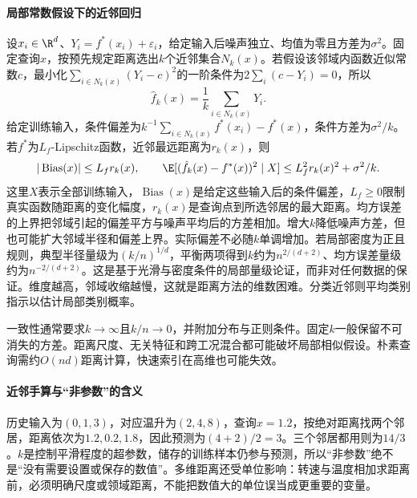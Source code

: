 \paragraph{局部常数假设下的近邻回归}
设$x_i\in\R^d$、$Y_i=f^*(x_i)+\varepsilon_i$，给定输入后噪声独立、均值为零且方差为$\sigma^2$。固定查询$x$，按预先规定距离选出$k$个近邻集合$N_k(x)$。若假设该邻域内函数近似常数$c$，最小化$\sum_{i\in N_k(x)}(Y_i-c)^2$的一阶条件为$2\sum_i(c-Y_i)=0$，所以
\begin{equation}
 \hat f_k(x)=\frac1k\sum_{i\in N_k(x)}Y_i.
\end{equation}
给定训练输入，条件偏差为$k^{-1}\sum_{i\in N_k(x)}f^*(x_i)-f^*(x)$，条件方差为$\sigma^2/k$。若$f^*$为$L_f$-Lipschitz函数，近邻最远距离为$r_k(x)$，则
\begin{equation}
 |\operatorname{Bias}(x)|\leq L_fr_k(x),\qquad
 \E[(\hat f_k(x)-f^*(x))^2\mid X]\leq L_f^2r_k(x)^2+\sigma^2/k.
\end{equation}
这里$X$表示全部训练输入，$\operatorname{Bias}(x)$是给定这些输入后的条件偏差，$L_f\ge0$限制真实函数随距离的变化幅度，$r_k(x)$是查询点到所选邻居的最大距离。均方误差的上界把邻域引起的偏差平方与噪声平均后的方差相加。增大$k$降低噪声方差，但也可能扩大邻域半径和偏差上界。实际偏差不必随$k$单调增加。若局部密度为正且规则，典型半径量级为$(k/n)^{1/d}$，平衡两项得到$k$约为$n^{2/(d+2)}$、均方误差量级约为$n^{-2/(d+2)}$。这是基于光滑与密度条件的局部量级论证，而非对任何数据的保证。维度越高，邻域收缩越慢，这就是距离方法的维数困难。分类近邻则平均类别指示以估计局部类别概率。

一致性通常要求$k\to\infty$且$k/n\to0$，并附加分布与正则条件。固定$k$一般保留不可消失的方差。距离尺度、无关特征和跨工况混合都可能破坏局部相似假设。朴素查询需约$O(nd)$距离计算，快速索引在高维也可能失效。

\paragraph{近邻手算与“非参数”的含义}
历史输入为$(0,1,3)$，对应温升为$(2,4,8)$，查询$x=1.2$，按绝对距离找两个邻居，距离依次为$1.2,0.2,1.8$，因此预测为$(4+2)/2=3$。三个邻居都用则为$14/3$。$k$是控制平滑程度的超参数，储存的训练样本仍参与预测，所以“非参数”绝不是“没有需要设置或保存的数值”。多维距离还受单位影响：转速与温度相加求距离前，必须明确尺度或领域距离，不能把数值大的单位误当成更重要的变量。


